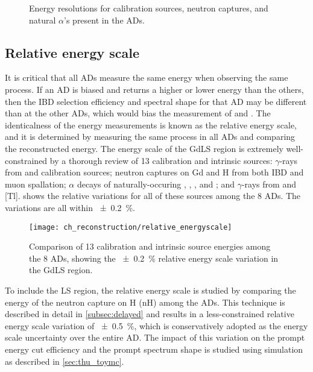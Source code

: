 \begin{figure}
    \caption{Energy resolutions for calibration sources, neutron captures,
        and natural $\alpha$'s present in the ADs.%
    }
    \label{fig:resolution}
\end{figure}


\subsection{Relative energy scale}
\label{subsec:rel_energyscale}

It is critical that all ADs measure the same energy when observing the same process.
If an AD is biased and returns a higher or lower energy than the others,
then the IBD selection efficiency and spectral shape for that AD
may be different than at the other ADs,
which would bias the measurement of \thetaot{} and \dmee{}.
The identicalness of the energy measurements is known as the relative energy scale,
and it is determined by measuring the same process in all ADs and comparing
the reconstructed energy.
The energy scale of the GdLS region is extremely well-constrained
by a thorough review of 13 calibration and intrinsic sources:
$\gamma$-rays from  and  calibration sources;
neutron captures on Gd and H from both IBD and muon spallation;
$\alpha$ decays of naturally-occuring ,
, , and ;
and $\gamma$-rays from  and [Tl].
 shows the relative variations
for all of these sources among the 8 ADs.
The variations are all within \SI{+-0.2}{\percent}.

\begin{figure}
    \centering
    \texttt{[image: ch\_reconstruction/relative\_energyscale]}
    \caption{
        Comparison of 13 calibration and intrinsic source energies
        among the 8 ADs, showing the \SI{+-0.2}{\percent}
        relative energy scale variation in the GdLS region.
    }
    \label{fig:gdls_rel_energyscale}
\end{figure}

To include the LS region, the relative energy scale is studied
by comparing the energy of the neutron capture on H (nH)
among the ADs.
This technique is described in detail in \cref{subsec:delayed}
and results in a less-constrained relative energy scale variation
of \SI{+-0.5}{\percent}, which is conservatively adopted
as the energy scale uncertainty over the entire AD.
The impact of this variation on the prompt energy cut efficiency
and the prompt spectrum shape
is studied using simulation
as described in \cref{sec:thu_toymc}.

